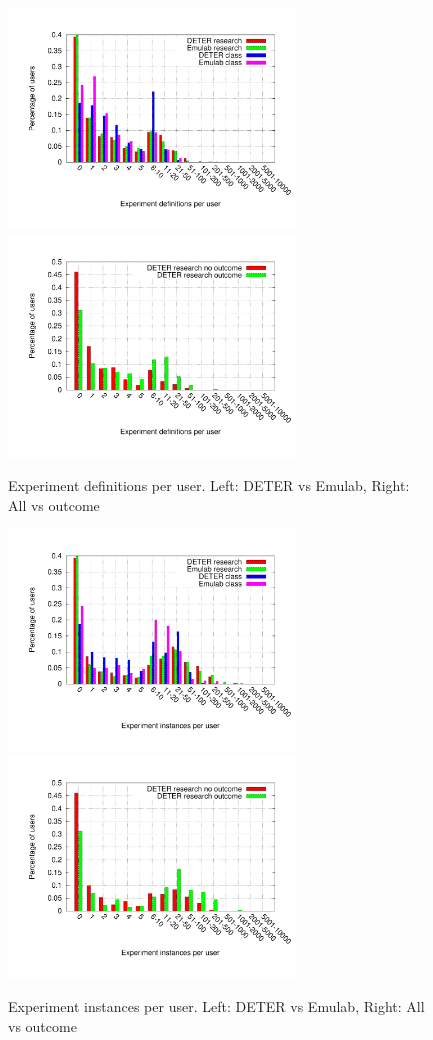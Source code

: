 \begin{figure}[htbp] \begin{center} \includegraphics[width=3in,
type=pdf,ext=.pdf,read=.pdf]{figs/user.exp.gnu}
\includegraphics[width=3in,
type=pdf,ext=.pdf,read=.pdf]{figs/user.exp.cmp.gnu} 
\caption{Experiment
definitions per user. Left: DETER vs Emulab, Right: All vs outcome}
\label{userexp} \end{center} \end{figure}

\begin{figure}[htbp] \begin{center} \includegraphics[width=3in,
type=pdf,ext=.pdf,read=.pdf]{figs/user.swaps.gnu}
\includegraphics[width=3in,
type=pdf,ext=.pdf,read=.pdf]{figs/user.swaps.cmp.gnu}
\caption{Experiment instances per user. Left: DETER vs Emulab, Right:
All vs outcome} \label{userswaps} \end{center} \end{figure}


